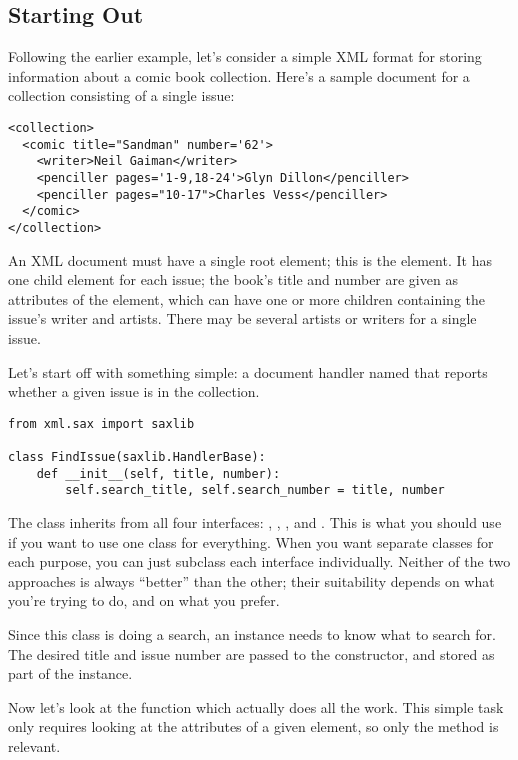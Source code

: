 \documentclass{howto}
\newcommand{\element}[1]{\code{#1}}
\begin{document}
\subsection{Starting Out}

Following the earlier example, let's consider a simple XML format for
storing information about a comic book collection.  Here's a sample
document for a collection consisting of a single issue:

\begin{verbatim}
<collection>
  <comic title="Sandman" number='62'>
    <writer>Neil Gaiman</writer>
    <penciller pages='1-9,18-24'>Glyn Dillon</penciller>
    <penciller pages="10-17">Charles Vess</penciller>
  </comic>
</collection>
\end{verbatim}

An XML document must have a single root element; this is the
 element.  It has one child \element{comic} element
for each issue; the book's title and number are given as attributes of
the \element{comic} element, which can have one or more children
containing the issue's writer and artists.  There may be several
artists or writers for a single issue.

Let's start off with something simple: a document handler named
 that reports whether a given issue is in the
collection.

\begin{verbatim}
from xml.sax import saxlib

class FindIssue(saxlib.HandlerBase):
    def __init__(self, title, number):
        self.search_title, self.search_number = title, number
\end{verbatim}

The  class inherits from all four interfaces:
, , ,
and .  This is what you should use if you
want to use one class for everything.  When you want separate classes
for each purpose, you can just subclass each interface individually.
Neither of the two approaches is always ``better'' than the other;
their suitability depends on what you're trying to do, and on what you
prefer.  

Since this class is doing a search, an instance needs to know what to
search for.  The desired title and issue number are passed to the
 constructor, and stored as part of the instance.

Now let's look at the function which actually does all the work.
This simple task only requires looking at the attributes of a given
element, so only the  method is relevant.
\end{document}
